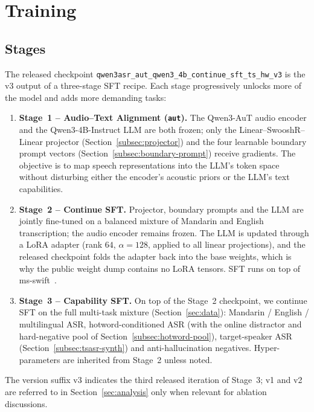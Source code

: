 \section{Training}
\label{sec:training}

\subsection{Stages}

The released checkpoint
\texttt{qwen3asr\_aut\_qwen3\_4b\_continue\_sft\_ts\_hw\_v3} is the v3
output of a three-stage SFT recipe. Each stage progressively unlocks
more of the model and adds more demanding tasks:

\begin{enumerate}
  \item \textbf{Stage~1 -- Audio--Text Alignment (\texttt{aut}).}
        The Qwen3-AuT audio encoder and the Qwen3-4B-Instruct LLM are
        both frozen; only the Linear--SwooshR--Linear projector
        (Section~\ref{subsec:projector}) and the four learnable
        boundary prompt vectors (Section~\ref{subsec:boundary-prompt})
        receive gradients. The objective is to map speech
        representations into the LLM's token space without disturbing
        either the encoder's acoustic priors or the LLM's text
        capabilities.
  \item \textbf{Stage~2 -- Continue SFT.} Projector, boundary prompts
        and the LLM are jointly fine-tuned on a balanced mixture of
        Mandarin and English transcription; the audio encoder remains
        frozen. The LLM is updated through a LoRA adapter (rank $64$,
        $\alpha=128$, applied to all linear projections), and the
        released checkpoint folds the adapter back into the base
        weights, which is why the public weight dump contains no LoRA
        tensors. SFT runs on top of ms-swift~\cite{msswift}.
  \item \textbf{Stage~3 -- Capability SFT.} On top of the Stage~2
        checkpoint, we continue SFT on the full multi-task mixture
        (Section~\ref{sec:data}): Mandarin / English / multilingual
        ASR, hotword-conditioned ASR (with the online distractor and
        hard-negative pool of Section~\ref{subsec:hotword-pool}),
        target-speaker ASR (Section~\ref{subsec:tsasr-synth}) and
        anti-hallucination negatives. Hyper-parameters are inherited
        from Stage~2 unless noted.
\end{enumerate}

The version suffix v3 indicates the third released iteration of
Stage~3; v1 and v2 are referred to in Section~\ref{sec:analysis}
only when relevant for ablation discussions.

